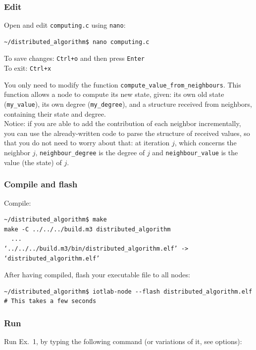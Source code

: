 \documentclass[oneside]{article}
\begin{document}
\subsubsection{Edit} %
Open and edit \verb=computing.c= using \verb=nano=:
\begin{verbatim}~/distributed_algorithm$ nano computing.c \end{verbatim}
To save changes: \verb=Ctrl+o= and then press \verb=Enter= \\
To exit: \verb=Ctrl+x=
    

You only need to modify the function \verb=compute_value_from_neighbours=.
This function allows a node to compute its new state, given: 
its own old state (\verb=my_value=),
its own degree (\verb=my_degree=), 
and a structure received from neighbors,
containing their state and degree.\\
Notice: if you are able to add the
contribution of each neighbor incrementally, you can use the
already-written code to parse the structure of received values, so that
you do not need to worry about that: at iteration $j$, which concerns
the neighbor $j$, 
\verb=neighbour_degree= is the degree of $j$ and
\verb=neighbour_value= is the value (the state) of $j$.
    

            
\subsubsection{Compile and flash}

Compile:
    \begin{verbatim}~/distributed_algorithm$ make
make -C ../../../build.m3 distributed_algorithm
  ...
‘../../../build.m3/bin/distributed_algorithm.elf’ -> ‘distributed_algorithm.elf’
\end{verbatim}

After having compiled, flash your executable file to all nodes:
    \begin{verbatim}~/distributed_algorithm$ iotlab-node --flash distributed_algorithm.elf
# This takes a few seconds
\end{verbatim}

        
\subsubsection{Run} %
Run Ex.~1, by typing the following command (or variations of it, see options):
\end{document}
